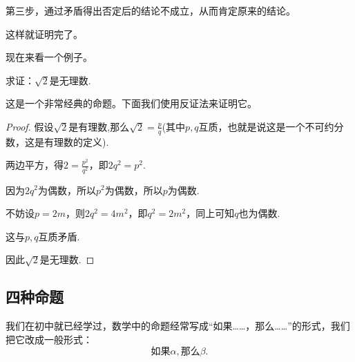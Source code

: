 \documentclass[lang=cn,math=cm,chinesefont=nofont,11pt,scheme=chinese,onecol]{elegantbook}
\begin{document}
第三步，通过矛盾得出否定后的结论不成立，从而肯定原来的结论。

这样就证明完了。

\hspace*{\fill}

现在来看一个例子。

\begin{example}
  求证：$\sqrt{2}$是无理数.
\end{example}
这是一个非常经典的命题。下面我们使用反证法来证明它。
\begin{proof}
  假设$\sqrt{2}$是有理数,那么$\sqrt{2}=\frac{p}{q}$(其中$p,q$互质，也就是说这是一个不可约分数，这是有理数的定义).

  两边平方，得$2=\frac{p^2}{q^2}$，即$2q^2=p^2$.

  因为$2q^2$为偶数，所以$p^2$为偶数，所以$p$为偶数.

  不妨设$p=2m$，则$2q^2=4m^2$，即$q^2=2m^2$，同上可知$q$也为偶数.

  这与$p,q$互质矛盾.

  因此$\sqrt{2}$是无理数.

\end{proof}

\subsection{四种命题}
我们在初中就已经学过，数学中的命题经常写成“如果……，那么……”的形式，我们把它改成一般形式：
$$\text{如果}\alpha ,\text{那么}\beta .$$
\end{document}
